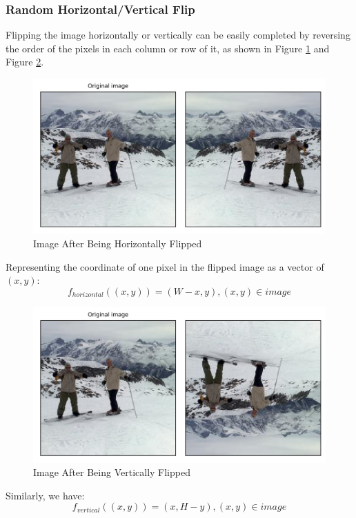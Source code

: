 \documentclass{article}
\begin{document}
\subsubsection{Random Horizontal/Vertical Flip}
Flipping the image horizontally or vertically can be easily completed by reversing the order of the pixels in each column or row of it, as shown in Figure \ref{fig4} and Figure \ref{fig5}.
\begin{figure}[H]
\centerline{\includegraphics[scale=0.3]{Horizontal 1.0.png}}
\caption{Image After Being Horizontally Flipped}
\label{fig4}
\end{figure}
Representing the coordinate of one pixel in the flipped image as a vector of $(x,y)$:
\begin{equation}
f_{horizontal}((x,y))=(W-x,y), (x,y)\in image
\end{equation}
\begin{figure}[H]
\centerline{\includegraphics[scale=0.3]{Vertical 1.0.png}}
\caption{Image After Being Vertically Flipped}
\label{fig5}
\end{figure}
Similarly, we have:
\begin{equation}
f_{vertical}((x,y))=(x,H-y), (x,y)\in image
\end{equation}
\end{document}
